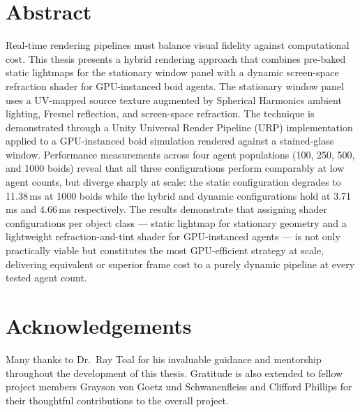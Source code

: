 \documentclass[12pt]{article}
\begin{document}
\section*{Abstract}

Real-time rendering pipelines must balance visual fidelity against computational cost. This thesis presents a hybrid rendering approach that combines pre-baked static lightmaps for the stationary window panel with a dynamic screen-space refraction shader for GPU-instanced boid agents. The stationary window panel uses a UV-mapped source texture augmented by Spherical Harmonics ambient lighting, Fresnel reflection, and screen-space refraction. The technique is demonstrated through a Unity Universal Render Pipeline (URP) implementation applied to a GPU-instanced boid simulation rendered against a stained-glass window. Performance measurements across four agent populations (100, 250, 500, and 1000 boids) reveal that all three configurations perform comparably at low agent counts, but diverge sharply at scale: the static configuration degrades to 11.38\,ms at 1000 boids while the hybrid and dynamic configurations hold at 3.71\,ms and 4.66\,ms respectively. The results demonstrate that assigning shader configurations per object class --- static lightmap for stationary geometry and a lightweight refraction-and-tint shader for GPU-instanced agents --- is not only practically viable but constitutes the most GPU-efficient strategy at scale, delivering equivalent or superior frame cost to a purely dynamic pipeline at every tested agent count.

\clearpage
\tableofcontents

\clearpage
\section*{Acknowledgements}

Many thanks to Dr.\ Ray Toal for his invaluable guidance and mentorship throughout the development of this thesis. Gratitude is also extended to fellow project members Grayson von Goetz und Schwanenfleiss and Clifford Phillips for their thoughtful contributions to the overall project.

\clearpage
{}

\clearpage
\end{document}
